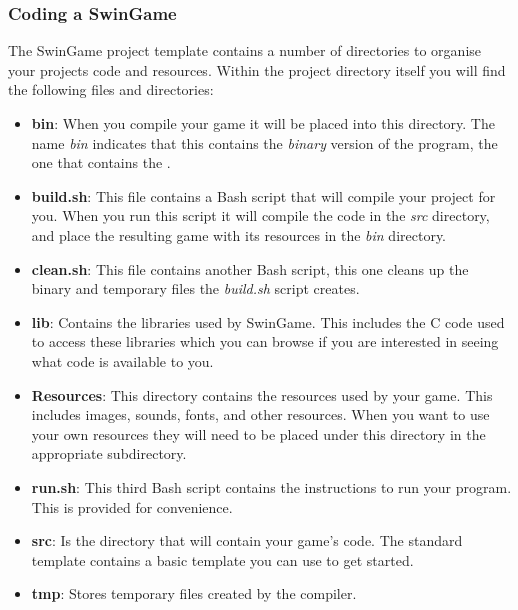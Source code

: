 
\clearpage
\subsubsection{Coding a SwinGame} %
\label{ssub:coding_a_swingame}

The SwinGame project template contains a number of directories to organise your projects code and resources. Within the project directory itself you will find the following files and directories:

\begin{itemize}
  \item \textbf{bin}: When you compile your game it will be placed into this directory. The name \emph{bin} indicates that this contains the \emph{binary} version of the program, the one that contains the .
  \item \textbf{build.sh}: This file contains a Bash script that will compile your project for you. When you run this script it will compile the code in the \emph{src} directory, and place the resulting game with its resources in the \emph{bin} directory.
  \item \textbf{clean.sh}: This file contains another Bash script, this one cleans up the binary and temporary files the \emph{build.sh} script creates.
  \item \textbf{lib}: Contains the libraries used by SwinGame. This includes the C code used to access these libraries which you can browse if you are interested in seeing what code is available to you.
  \item \textbf{Resources}: This directory contains the resources used by your game. This includes images, sounds, fonts, and other resources. When you want to use your own resources they will need to be placed under this directory in the appropriate subdirectory.
  \item \textbf{run.sh}: This third Bash script contains the instructions to run your program. This is provided for convenience.
  \item \textbf{src}: Is the directory that will contain your game's code. The standard template contains a basic template you can use to get started.
  \item \textbf{tmp}: Stores temporary files created by the compiler. 
\end{itemize}

